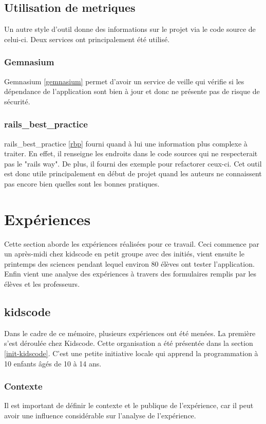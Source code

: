 \subsection{Utilisation de metriques}%
Un autre style d'outil donne des informations sur le projet via le code source de celui-ci. Deux services ont principalement été utilisé.

\subsubsection{Gemnasium}
Gemnasium \ref{gemnasium} permet d'avoir un service de veille qui vérifie si les dépendance de l'application sont bien à jour et donc ne présente pas de risque de sécurité.

\subsubsection{rails\_best\_practice}
rails\_best\_practice \ref{rbp} fourni quand à lui une information plus complexe à traiter. En effet, il renseigne les endroits dans le code sources qui ne respecterait pas le "rails way". De plus, il fourni des exemple pour refactorer ceux-ci. Cet outil est donc utile principalement en début de projet quand les auteurs ne connaissent pas encore bien quelles sont les bonnes pratiques.

\section{Expériences}
Cette section aborde les expériences réalisées pour ce travail. Ceci commence par un après-midi chez kidscode en petit groupe avec des initiés, vient ensuite le printemps des sciences pendant lequel environ 80 élèves ont tester l'application. Enfin vient une analyse des expériences à travers des formulaires remplis par les élèves et les professeurs.
\subsection{kidscode}
\label{kidscode}
Dans le cadre de ce mémoire, plusieurs expériences ont été menées. La première s'est déroulée chez Kidscode. Cette organisation a été présentée dans la section \ref{init-kidscode}. C'est une petite initiative locale qui apprend la programmation à 10 enfants âgés de 10 à 14 ans.

\subsubsection{Contexte}
\label{context-kidscode}
Il est important de définir le contexte et le publique de l'expérience, car il peut avoir une influence considérable sur l'analyse de l'expérience.\\

